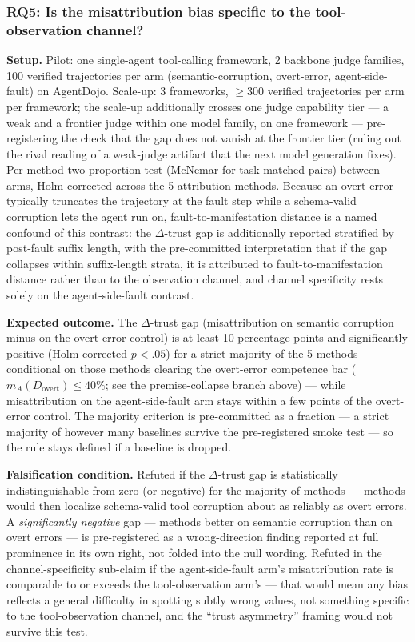 \documentclass[11pt]{article}
\begin{document}
\subsubsection{RQ5: Is the misattribution bias specific to the tool-observation channel?}
\textbf{Setup.} Pilot: one single-agent tool-calling framework, 2 backbone judge families, 100 verified trajectories per arm (semantic-corruption, overt-error, agent-side-fault) on AgentDojo. Scale-up: 3 frameworks, $\geq 300$ verified trajectories per arm per framework; the scale-up additionally crosses one judge capability tier --- a weak and a frontier judge within one model family, on one framework --- pre-registering the check that the gap does not vanish at the frontier tier (ruling out the rival reading of a weak-judge artifact that the next model generation fixes). Per-method two-proportion test (McNemar for task-matched pairs) between arms, Holm-corrected across the 5 attribution methods. Because an overt error typically truncates the trajectory at the fault step while a schema-valid corruption lets the agent run on, fault-to-manifestation distance is a named confound of this contrast: the $\Delta$-trust gap is additionally reported stratified by post-fault suffix length, with the pre-committed interpretation that if the gap collapses within suffix-length strata, it is attributed to fault-to-manifestation distance rather than to the observation channel, and channel specificity rests solely on the agent-side-fault contrast.

\textbf{Expected outcome.} The $\Delta$-trust gap (misattribution on semantic corruption minus on the overt-error control) is at least 10 percentage points and significantly positive (Holm-corrected $p < .05$) for a strict majority of the 5 methods --- conditional on those methods clearing the overt-error competence bar ($m_A(D_{\text{overt}}) \leq 40\%$; see the premise-collapse branch above) --- while misattribution on the agent-side-fault arm stays within a few points of the overt-error control. The majority criterion is pre-committed as a fraction --- a strict majority of however many baselines survive the pre-registered smoke test --- so the rule stays defined if a baseline is dropped.

\textbf{Falsification condition.} Refuted if the $\Delta$-trust gap is statistically indistinguishable from zero (or negative) for the majority of methods --- methods would then localize schema-valid tool corruption about as reliably as overt errors. A \emph{significantly negative} gap --- methods better on semantic corruption than on overt errors --- is pre-registered as a wrong-direction finding reported at full prominence in its own right, not folded into the null wording. Refuted in the channel-specificity sub-claim if the agent-side-fault arm's misattribution rate is comparable to or exceeds the tool-observation arm's --- that would mean any bias reflects a general difficulty in spotting subtly wrong values, not something specific to the tool-observation channel, and the ``trust asymmetry'' framing would not survive this test.
\end{document}
